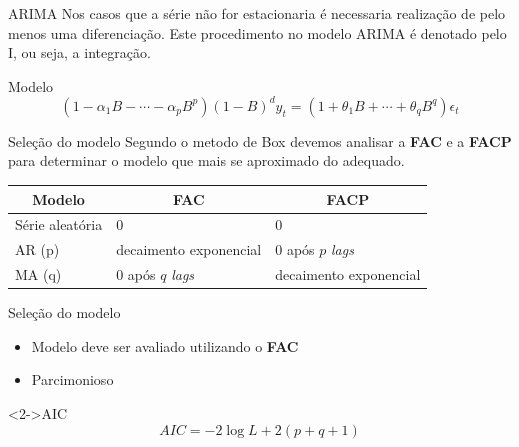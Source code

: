 \documentclass[compress,aspectratio=149,brazil]{beamer}
\begin{document}
\begin{frame}{ARIMA}
    Nos casos que a série não for estacionaria é necessaria realização de pelo
    menos uma diferenciação. Este procedimento no modelo ARIMA é denotado pelo
    I, ou seja, a integração.

    \begin{block}{Modelo}
        \[
            (1 - \alpha_1B-\cdots-\alpha_pB^p)(1-B)^dy_t=(1+\theta_1B+\cdots+\theta_qB^q)\epsilon_t
        \]
    \end{block}
\end{frame}

\begin{frame}{Seleção do modelo}
    Segundo o metodo de Box devemos analisar a \textbf{FAC} e a \textbf{FACP}
    para determinar o modelo que mais se aproximado do adequado.

    \begin{table}[ht]
        \centering
        \begin{tabular}{l l l}
            \multicolumn{1}{c}{Modelo} & \multicolumn{1}{c}{FAC} & \multicolumn{1}{c}{FACP} \\
            \toprule
            Série aleatória  & 0                           & 0                        \\
            AR (p)           & decaimento exponencial      & 0 após $p$ \textit{lags} \\
            MA (q)           & 0 após $q$ \textit{lags}    & decaimento exponencial   \\
        \end{tabular}
    \end{table}
\end{frame}

\begin{frame}{Seleção do modelo}
    \begin{itemize}
        \item Modelo deve ser avaliado utilizando o \textbf{FAC}
        \item<2-> Parcimonioso
    \end{itemize}
    \begin{block}<2->{AIC}
        \[
            AIC = -2\log{L}+2(p+q+1)
        \]
    \end{block}
\end{frame}
\end{document}
